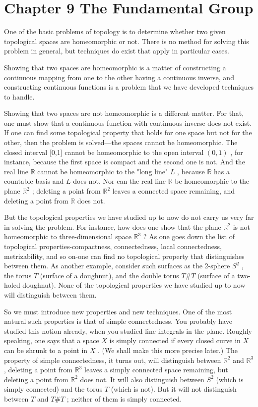 \documentclass[10pt]{article}
\begin{document}
\section*{Chapter 9 The Fundamental Group}

One of the basic problems of topology is to determine whether two given topological spaces are homeomorphic or not. There is no method for solving this problem in general, but techniques do exist that apply in particular cases.

Showing that two spaces are homeomorphic is a matter of constructing a continuous mapping from one to the other having a continuous inverse, and constructing continuous functions is a problem that we have developed techniques to handle.

Showing that two spaces are not homeomorphic is a different matter. For that, one must show that a continuous function with continuous inverse does not exist. If one can find some topological property that holds for one space but not for the other, then the problem is solved—the spaces cannot be homeomorphic. The closed interval [0,1] cannot be homeomorphic to the open interval \(\left( {0,1}\right)\) , for instance, because the first space is compact and the second one is not. And the real line \(\mathbb{R}\) cannot be homeomorphic to the "long line" \(L\) , because \(\mathbb{R}\) has a countable basis and \(L\) does not. Nor can the real line \(\mathbb{R}\) be homeomorphic to the plane \({\mathbb{R}}^{2}\) ; deleting a point from \({\mathbb{R}}^{2}\) leaves a connected space remaining, and deleting a point from \(\mathbb{R}\) does not.

But the topological properties we have studied up to now do not carry us very far in solving the problem. For instance, how does one show that the plane \({\mathbb{R}}^{2}\) is not homeomorphic to three-dimensional space \({\mathbb{R}}^{3}\) ? As one goes down the list of topological properties-compactness, connectedness, local connectedness, metrizability, and so on-one can find no topological property that distinguishes between them. As another example, consider such surfaces as the 2-sphere \({S}^{2}\) , the torus \(T\) (surface of a doughnut), and the double torus \(T\# T\) (surface of a two-holed doughnut). None of the topological properties we have studied up to now will distinguish between them.

So we must introduce new properties and new techniques. One of the most natural such properties is that of simple connectedness. You probably have studied this notion already, when you studied line integrals in the plane. Roughly speaking, one says that a space \(X\) is simply connected if every closed curve in \(X\) can be shrunk to a point in \(X\) . (We shall make this more precise later.) The property of simple connectedness, it turns out, will distinguish between \({\mathbb{R}}^{2}\) and \({\mathbb{R}}^{3}\) , deleting a point from \({\mathbb{R}}^{3}\) leaves a simply connected space remaining, but deleting a point from \({\mathbb{R}}^{2}\) does not. It will also distinguish between \({S}^{2}\) (which is simply connected) and the torus \(T\) (which is not). But it will not distinguish between \(T\) and \(T\# T\) ; neither of them is simply connected.
\end{document}
